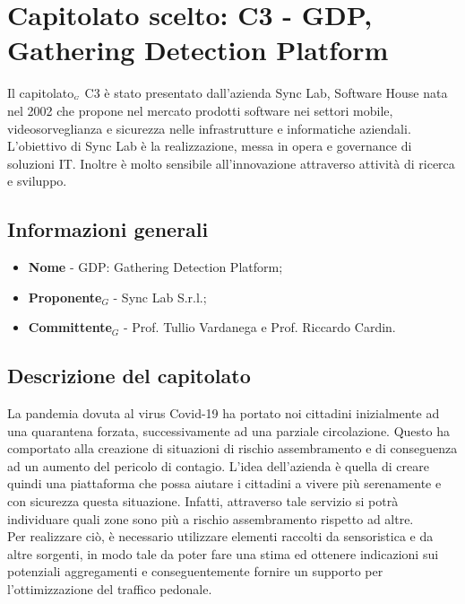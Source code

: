 \chapter{Capitolato scelto: C3 - GDP, Gathering Detection Platform} \label{CapitolatoC3}

Il capitolato$_{\scaleto{G}{3pt}}$ C3 è stato presentato dall'azienda Sync Lab, Software House  nata nel 2002 che propone nel mercato prodotti software nei settori mobile, videosorveglianza e sicurezza nelle infrastrutture e informatiche aziendali. L’obiettivo di Sync Lab è la realizzazione, messa in opera e governance di soluzioni IT. Inoltre è molto sensibile all'innovazione attraverso attività di ricerca  e sviluppo.

\section{Informazioni generali} \label{C3InformazioniGenerali}
\begin{itemize}
	\item \textbf{Nome} - GDP: Gathering Detection Platform;
	\item \textbf{Proponente}$_G$ - Sync Lab S.r.l.;
	\item \textbf{Committente}$_G$ - Prof. Tullio Vardanega e Prof. Riccardo Cardin.
\end{itemize}
\section{Descrizione del capitolato} \label{C3DescrizioneDelCapitolato}
La pandemia dovuta al  virus Covid-19 ha portato noi cittadini inizialmente ad una quarantena forzata, successivamente ad una parziale circolazione. Questo ha comportato alla creazione di situazioni di rischio assembramento e di conseguenza ad un aumento del  pericolo di contagio. L'idea dell'azienda è quella di creare quindi una piattaforma che possa aiutare i cittadini a vivere più serenamente e con sicurezza questa situazione. Infatti, attraverso tale servizio si potrà individuare quali zone sono più a rischio assembramento rispetto ad altre. \\
Per realizzare ciò, è necessario utilizzare elementi raccolti da sensoristica e da altre sorgenti, in modo tale da poter fare una stima ed ottenere indicazioni sui potenziali aggregamenti e conseguentemente fornire un supporto per l'ottimizzazione del traffico pedonale.
